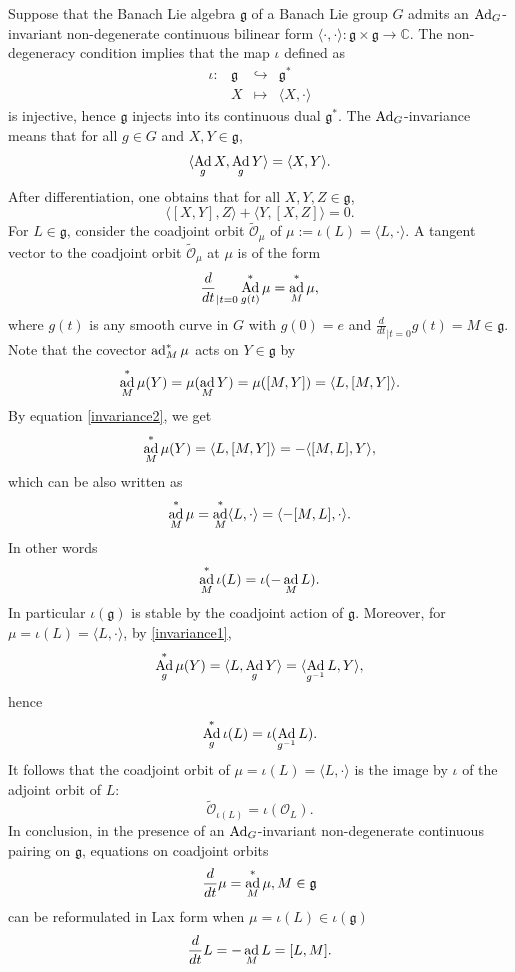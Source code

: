 \documentclass[a4paper,12pt,reqno]{amsart}%
\theoremstyle{definition}
\theoremstyle{remark}
\numberwithin{theorem}{section}
\numberwithin{equation}{section}
\newcommand{\1}{{\bf 1}}
\DeclareMathOperator{\ad}{\textnormal{ad}}
\DeclareMathOperator{\Ad}{\textnormal{Ad}}
\newcommand{\g}{{\mathfrak g}}
\newcommand\C{{\mathbb{C}}}
\begin{document}
Suppose that the Banach Lie algebra $\g$ of a Banach Lie group $G$ admits an $\Ad_G$-invariant non-degenerate continuous bilinear form
$\langle\cdot, \cdot\rangle: \g \times \g\rightarrow \C$. The non-degeneracy condition implies that the map $\iota$ defined as
\[
\begin{array}{llll}
\iota: & \g & \hookrightarrow & \g^*\\
& X & \mapsto & \langle X, \cdot\rangle
\end{array}
\]
is injective, hence $\g$ injects into its continuous dual $\g^*$. 
The $\Ad_G$-invariance means that for all $g\in G$ and $ X, Y\in \g$,
\begin{equation}\label{invariance1}
\langle\Ad_g X, \Ad_g Y \rangle = \langle X, Y \rangle. 
\end{equation}
After differentiation, one obtains that for all $X, Y, Z \in \g$, 
\begin{equation}\label{invariance2}
\langle [X, Y], Z\rangle + \langle Y, [X, Z]\rangle = 0.
\end{equation}
For $L\in \g$, consider the coadjoint orbit $\tilde{\mathcal{O}}_\mu$ of $\mu := \iota(L) = \langle L, \cdot\rangle$. A tangent vector to the coadjoint orbit $\tilde{\mathcal{O}}_\mu$ at $\mu$ is of the form
\[
\frac{d}{dt}_{|t = 0}\Ad^*_{g(t)}\mu = \ad^*_M\mu,
\]
where $g(t)$ is any smooth curve in $G$ with $g(0) = e$ and $\frac{d}{dt}_{|t = 0}g(t) =  M\in \g$.
Note that the covector $\ad^*_M\mu$ acts on $Y\in \g$ by
\[
\ad^*_M\mu(Y) = \mu(\ad_M Y) = \mu([M, Y]) = \langle L, [M, Y]\rangle.
\]
By equation \eqref{invariance2}, we get
\[
\ad^*_M\mu(Y) = \langle L, [M, Y]\rangle = -\langle [M, L], Y\rangle,
\]
which can be also written as
\[
\ad^*_M\mu = \ad^*_M\langle L, \cdot\rangle = \langle -[M, L], \cdot\rangle.
\]
In other words
\begin{equation}\label{equ:iota}
\ad^*_M\iota(L) = \iota(-\ad_M L).
\end{equation}
In particular $\iota(\g)$ is stable by the coadjoint action of $\g$. 
Moreover, for $\mu = \iota(L) = \langle L, \cdot\rangle$,  by \eqref{invariance1},
\[
\Ad^*_g\mu (Y) = \langle L, \Ad_g Y\rangle = \langle \Ad_{g^{-1}} L,  Y\rangle,
\]
hence 
\[
\Ad^*_g\iota(L) = \iota(\Ad_{g^{-1}} L).
\]
It follows that the coadjoint orbit of $\mu = \iota(L) = \langle L, \cdot\rangle$ is the image by $\iota$ of the adjoint orbit of $L$:
\[
\tilde{\mathcal O}_{\iota(L)} = \iota\left(\mathcal{O}_L\right).
\]
In conclusion, in the presence of an $\Ad_G$-invariant non-degenerate continuous pairing on $\g$, equations on coadjoint orbits
\[
\frac{d}{dt}\mu = \ad^*_M\mu, M\in\g
\]
can be reformulated in Lax form when $\mu = \iota(L) \in \iota(\g)$
\[
\frac{d}{dt} L = -\ad_M L = [L, M].
\]
\end{document}
